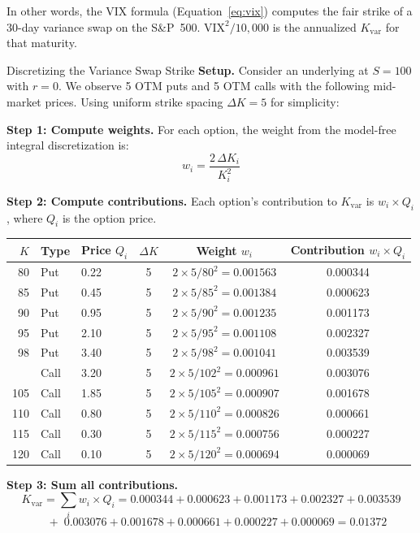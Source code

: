 In other words, the VIX formula (Equation~\ref{eq:vix}) computes the fair strike of a 30-day variance swap on the S\&P~500.
$\text{VIX}^2 / 10{,}000$ is the annualized $K_{\text{var}}$ for that maturity.

\begin{workedexample}{Discretizing the Variance Swap Strike}
\label{ex:varswap-strike}
\textbf{Setup.} Consider an underlying at $S = 100$ with $r = 0$.
We observe 5 OTM puts and 5 OTM calls with the following mid-market prices.
Using uniform strike spacing $\Delta K = 5$ for simplicity:

\textbf{Step 1: Compute weights.}
For each option, the weight from the model-free integral discretization is:
\[
  w_i = \frac{2\,\Delta K_i}{K_i^2}
\]

\textbf{Step 2: Compute contributions.}
Each option's contribution to $K_{\text{var}}$ is $w_i \times Q_i$, where $Q_i$ is the option price.

\begin{center}
\begin{tabular}{@{}rllccc@{}}
\toprule
$K$ & Type & Price $Q_i$ & $\Delta K$ & Weight $w_i$ & Contribution $w_i \times Q_i$ \\
\midrule
80  & Put  & 0.22 & 5 & $2 \times 5 / 80^2 = 0.001563$ & 0.000344 \\
85  & Put  & 0.45 & 5 & $2 \times 5 / 85^2 = 0.001384$ & 0.000623 \\
90  & Put  & 0.95 & 5 & $2 \times 5 / 90^2 = 0.001235$ & 0.001173 \\
95  & Put  & 2.10 & 5 & $2 \times 5 / 95^2 = 0.001108$ & 0.002327 \\
98  & Put  & 3.40 & 5 & $2 \times 5 / 98^2 = 0.001041$ & 0.003539 \\
\addlinespace
102 & Call & 3.20 & 5 & $2 \times 5 / 102^2 = 0.000961$ & 0.003076 \\
105 & Call & 1.85 & 5 & $2 \times 5 / 105^2 = 0.000907$ & 0.001678 \\
110 & Call & 0.80 & 5 & $2 \times 5 / 110^2 = 0.000826$ & 0.000661 \\
115 & Call & 0.30 & 5 & $2 \times 5 / 115^2 = 0.000756$ & 0.000227 \\
120 & Call & 0.10 & 5 & $2 \times 5 / 120^2 = 0.000694$ & 0.000069 \\
\bottomrule
\end{tabular}
\end{center}

\textbf{Step 3: Sum all contributions.}
\[
  K_{\text{var}} = \sum_i w_i \times Q_i = 0.000344 + 0.000623 + 0.001173 + 0.002327 + 0.003539
\]
\[
  \quad + \; 0.003076 + 0.001678 + 0.000661 + 0.000227 + 0.000069 = 0.01372
\]


\end{workedexample}
